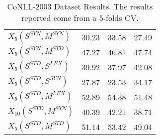 \begin{table}[]
\begin{tabular}{@{\makebox[1.50em][l]{\rownumber\space}}lccc@{}}
$X_5(S^{SYN}, M^{SYN})$  & 30.23           & 33.58            & 27.49           \\ 
$X_5(S^{SYN}, M^{STD})$  & 47.27           & 46.81            & 47.74           \\  
%
$X_5(S^{STD}, S^{LEX})$      & 39.92           & 37.97           & 42.08           \\
$X_5(S^{STD}, S^{SYN})$  &27.87				&23.53						&34.17    \\ 
$X_5(S^{STD}, M^{LEX})$  & 52.89           & 54.38            & 51.48           \\ 
$X_{10}(S^{STD}, M^{SYN})$  & 40.39           & 42.21            & 38.71           \\ 
$X_5(S^{STD}, M^{STD})$  &51.14	&53.42	&49.04            \\  \bottomrule
\end{tabular}
\caption{CoNLL-2003 Dataset Results. The results reported come from a 5-folds CV.}
\label{tab:wikigold}
\end{table}

